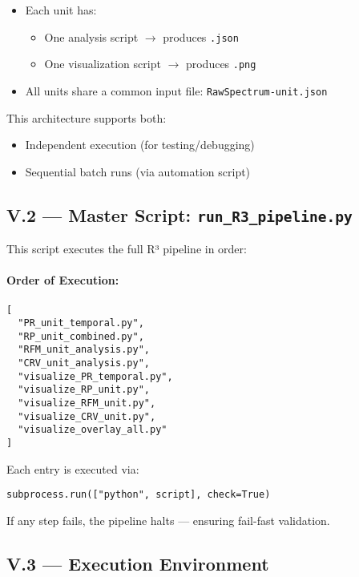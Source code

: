 \begin{itemize}
    \item Each unit has:
    \begin{itemize}
        \item One analysis script $\rightarrow$ produces \texttt{.json}
        \item One visualization script $\rightarrow$ produces \texttt{.png}
    \end{itemize}
    \item All units share a common input file: \texttt{RawSpectrum-unit.json}
\end{itemize}

This architecture supports both:

\begin{itemize}
    \item Independent execution (for testing/debugging)
    \item Sequential batch runs (via automation script)
\end{itemize}

\subsection*{V.2 — Master Script: \texttt{run\_R3\_pipeline.py}}

This script executes the full R³ pipeline in order:

\paragraph{Order of Execution:}
\begin{verbatim}
[
  "PR_unit_temporal.py",
  "RP_unit_combined.py",
  "RFM_unit_analysis.py",
  "CRV_unit_analysis.py",
  "visualize_PR_temporal.py",
  "visualize_RP_unit.py",
  "visualize_RFM_unit.py",
  "visualize_CRV_unit.py",
  "visualize_overlay_all.py"
]
\end{verbatim}

Each entry is executed via:

\begin{verbatim}
subprocess.run(["python", script], check=True)
\end{verbatim}

If any step fails, the pipeline halts — ensuring fail-fast validation.

\subsection*{V.3 — Execution Environment}


